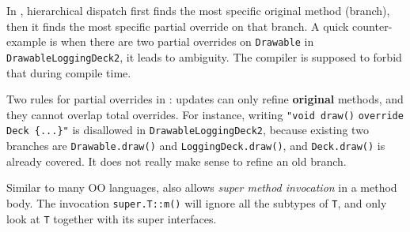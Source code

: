 In \MIM{}, hierarchical dispatch first finds the most specific original method (branch), then it finds the most specific partial override on that branch. A quick counter-example is when there are two partial overrides on \lstinline|Drawable| in \lstinline|DrawableLoggingDeck2|, it leads to ambiguity. The compiler is supposed to forbid that during compile time.

Two rules for partial overrides in \MIM: updates can only refine \textbf{original} methods, and they cannot overlap total overrides. For instance, writing \lstinline|"void draw()| \lstinline|override Deck {...}"| is disallowed in \lstinline|DrawableLoggingDeck2|, because existing two branches are \lstinline|Drawable.draw()| and \lstinline|LoggingDeck.draw()|, and \lstinline|Deck.draw()| is already covered. It does not really make sense to refine an old branch.

Similar to many OO languages, \MIM{} also allows \textit{super method invocation} in a method body. The invocation \lstinline|super.T::m()| will ignore all the subtypes of \lstinline|T|, and only look at \lstinline|T| together with its super interfaces.